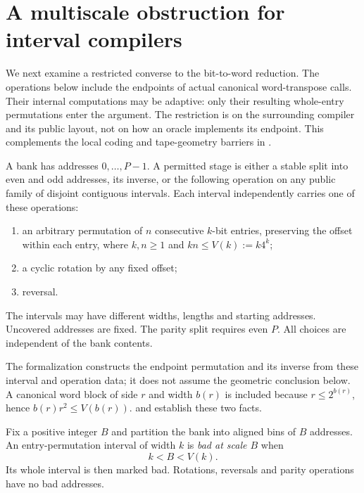 \section{A multiscale obstruction for interval compilers}
\label{sec:geometry}

We next examine a restricted converse to the bit-to-word reduction. The
operations below include the endpoints of actual canonical word-transpose
calls. Their internal computations may be adaptive: only their resulting
whole-entry permutations enter the argument. The restriction is on the
surrounding compiler and its public layout, not on how an oracle implements
its endpoint. This complements the local coding and tape-geometry barriers
in \cite{FirstPaper2026,SecondPaper2026}.

\begin{definition}
\label{def:geometry-stage}
A bank has addresses $0,\ldots,P-1$. A permitted stage is either a stable
split into even and odd addresses, its inverse, or the following operation
on any public family of disjoint contiguous intervals. Each interval
independently carries one of these operations:
\begin{enumerate}[label=(\roman*),nosep]
\item an arbitrary permutation of $n$ consecutive $k$-bit entries,
      preserving the offset within each entry, where $k,n\geq1$ and
      $kn\leq V(k):=k4^k$;
\item a cyclic rotation by any fixed offset;
\item reversal.
\end{enumerate}
The intervals may have different widths, lengths and starting addresses.
Uncovered addresses are fixed. The parity split requires even $P$.
All choices are independent of the bank contents.
\end{definition}

The formalization constructs the endpoint permutation and its inverse from
these interval and operation data; it does not assume the geometric
conclusion below. A canonical word block of side $r$ and width $b(r)$ is
included because $r\leq2^{b(r)}$, hence $b(r)r^2\leq V(b(r))$.
 and
 establish these two facts.

Fix a positive integer $B$ and partition the bank into aligned bins of
$B$ addresses. An entry-permutation interval of width $k$ is \emph{bad at
scale $B$} when
\[
                     k<B<V(k).
\]
Its whole interval is then marked bad. Rotations, reversals and parity
operations have no bad addresses.

